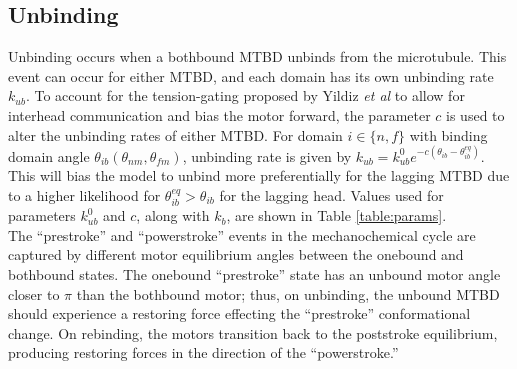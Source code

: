 \documentclass[9pt,twocolumn,twoside]{pnas-new}
\begin{document}
\subsection*{Unbinding}
Unbinding occurs when a bothbound MTBD unbinds from the microtubule. This event can occur for either MTBD, and each domain has its own unbinding rate $k_{ub}$. To account for the tension-gating proposed by Yildiz \textit{et al} \cite{yildiz} to allow for interhead communication and bias the motor forward, the parameter $c$ is used to alter the unbinding rates of either MTBD. For domain $i \in \{n, f\}$ with binding domain angle $\theta_{ib}\left(\theta_{nm}, \theta_{fm}\right)$, unbinding rate is given by $k_{ub} = k^0_{ub}e^{-c\left(\theta_{ib}-\theta^{eq}_{ib}\right)}$. This will bias the model to unbind more preferentially for the lagging MTBD due to a higher likelihood for $\theta^{eq}_{ib} > \theta_{ib}$ for the lagging head. Values used for parameters $k^0_{ub}$ and $c$, along with $k_b$, are shown in Table \ref{table:params}.\\

The ``prestroke'' and ``powerstroke'' events in the mechanochemical cycle \cite{cianfrocco} are captured by different motor equilibrium angles between the onebound and bothbound states. The onebound ``prestroke'' state has an unbound motor angle closer to $\pi$ than the bothbound motor\cite{burgess-paper}; thus, on unbinding, the unbound MTBD should experience a restoring force effecting the ``prestroke'' conformational change. On rebinding, the motors transition back to the poststroke equilibrium, producing restoring forces in the direction of the ``powerstroke.''
\end{document}
